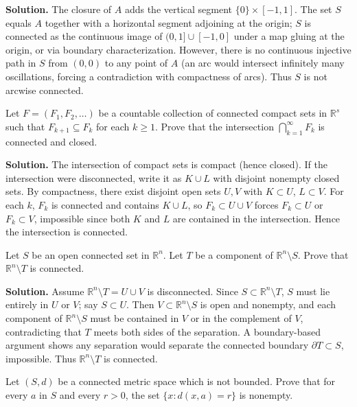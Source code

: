 \noindent\textbf{Solution.}
The closure of $A$ adds the vertical segment $\{0\}\times[-1,1]$. The set $S$ equals $A$ together with a horizontal segment adjoining at the origin; $S$ is connected as the continuous image of $(0,1]\cup[-1,0]$ under a map gluing at the origin, or via boundary characterization. However, there is no continuous injective path in $S$ from $(0,0)$ to any point of $A$ (an arc would intersect infinitely many oscillations, forcing a contradiction with compactness of arcs). Thus $S$ is not arcwise connected.
\medskip

\begin{problembox}
Let $F = (F_1, F_2, \ldots)$ be a countable collection of connected compact sets in $\mathbb{R}^s$ such that $F_{k+1} \subseteq F_k$ for each $k \geq 1$. Prove that the intersection $\bigcap_{k=1}^{\infty} F_k$ is connected and closed.
\end{problembox}

\noindent\textbf{Solution.}
The intersection of compact sets is compact (hence closed). If the intersection were disconnected, write it as $K\cup L$ with disjoint nonempty closed sets. By compactness, there exist disjoint open sets $U,V$ with $K\subset U$, $L\subset V$. For each $k$, $F_k$ is connected and contains $K\cup L$, so $F_k\subset U\cup V$ forces $F_k\subset U$ or $F_k\subset V$, impossible since both $K$ and $L$ are contained in the intersection. Hence the intersection is connected.
\medskip

\begin{problembox}
Let $S$ be an open connected set in $\mathbb{R}^n$. Let $T$ be a component of $\mathbb{R}^n \setminus S$. Prove that $\mathbb{R}^n \setminus T$ is connected.
\end{problembox}

\noindent\textbf{Solution.}
Assume $\mathbb{R}^n\setminus T=U\cup V$ is disconnected. Since $S\subset\mathbb{R}^n\setminus T$, $S$ must lie entirely in $U$ or $V$; say $S\subset U$. Then $V\subset \mathbb{R}^n\setminus S$ is open and nonempty, and each component of $\mathbb{R}^n\setminus S$ must be contained in $V$ or in the complement of $V$, contradicting that $T$ meets both sides of the separation. A boundary-based argument shows any separation would separate the connected boundary $\partial T\subset S$, impossible. Thus $\mathbb{R}^n\setminus T$ is connected.
\medskip

\begin{problembox}
Let $(S, d)$ be a connected metric space which is not bounded. Prove that for every $a$ in $S$ and every $r > 0$, the set $\{x : d(x, a) = r\}$ is nonempty.
\end{problembox}

